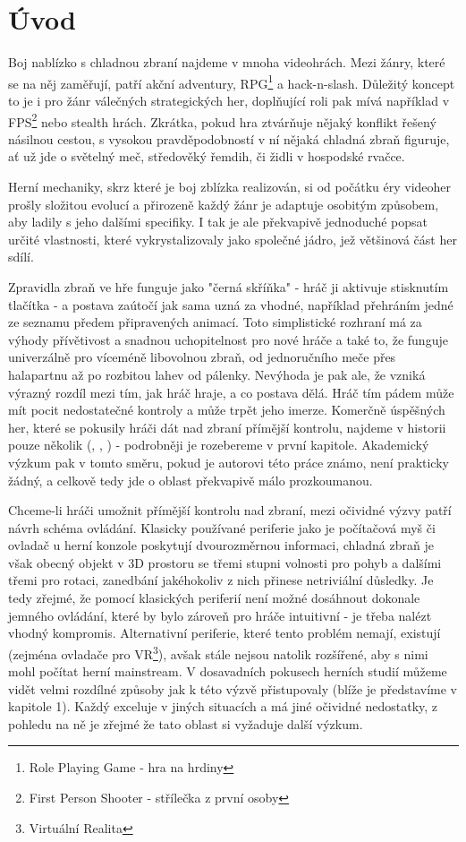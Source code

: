 \chapter*{Úvod}

Boj nablízko s chladnou zbraní najdeme v mnoha videohrách. Mezi žánry, které se na něj zaměřují, patří akční adventury, RPG\footnote{Role Playing Game - hra na hrdiny} a hack-n-slash. Důležitý koncept to je i pro žánr válečných strategických her, doplňující roli pak mívá například v FPS\footnote{First Person Shooter - střílečka z první osoby} nebo stealth hrách. Zkrátka, pokud hra ztvárňuje nějaký konflikt řešený násilnou cestou, s vysokou pravděpodobností v ní nějaká chladná zbraň figuruje, ať už jde o světelný meč, středověký řemdih, či židli v hospodské rvačce.

Herní mechaniky, skrz které je boj zblízka realizován, si od počátku éry videoher prošly složitou evolucí a přirozeně každý žánr je adaptuje osobitým způsobem, aby ladily s jeho dalšími specifiky. I tak je ale překvapivě jednoduché popsat určité vlastnosti, které vykrystalizovaly jako společné jádro, jež většinová část her sdílí.

Zpravidla zbraň ve hře funguje jako "černá skříňka" - hráč ji aktivuje stisknutím tlačítka - a postava zaútočí jak sama uzná za vhodné, například přehráním jedné ze seznamu předem připravených animací. Toto simplistické rozhraní má za výhody přívětivost a snadnou uchopitelnost pro nové hráče a také to, že funguje univerzálně pro víceméně libovolnou zbraň, od jednoručního meče přes halapartnu až po rozbitou lahev od pálenky. Nevýhoda je pak ale, že vzniká výrazný rozdíl mezi tím, jak hráč hraje, a co postava dělá. Hráč tím pádem může mít pocit nedostatečné kontroly a může trpět jeho imerze. Komerčně úspěšných her, které se pokusily hráči dát nad zbraní přímější kontrolu, najdeme v historii pouze několik (\citet{DieByTheSword}, \citet{MountAndBlade}, \citet{KCD}) - podrobněji je rozebereme v první kapitole. Akademický výzkum pak v tomto směru, pokud je autorovi této práce známo, není prakticky žádný, a celkově tedy jde o oblast překvapivě málo prozkoumanou.
  
Chceme-li hráči umožnit přímější kontrolu nad zbraní, mezi očividné výzvy patří návrh schéma ovládání. Klasicky používané periferie jako je počítačová myš či ovladač u herní konzole poskytují dvourozměrnou informaci, chladná zbraň je však obecný objekt v 3D prostoru se třemi stupni volnosti pro pohyb a dalšími třemi pro rotaci, zanedbání jakéhokoliv z nich přinese netriviální důsledky. Je tedy zřejmé, že pomocí klasických periferií není možné dosáhnout dokonale jemného ovládání, které by bylo zároveň pro hráče intuitivní - je třeba nalézt vhodný kompromis. Alternativní periferie, které tento problém nemají, existují (zejména ovladače pro VR\footnote{Virtuální Realita}), avšak stále nejsou natolik rozšířené, aby s nimi mohl počítat herní mainstream. V dosavadních pokusech herních studií můžeme vidět velmi rozdílné způsoby jak k této výzvě přistupovaly (blíže je představíme v kapitole 1). Každý exceluje v jiných situacích a má jiné očividné nedostatky, z pohledu na ně je zřejmé že tato oblast si vyžaduje další výzkum. 
 
